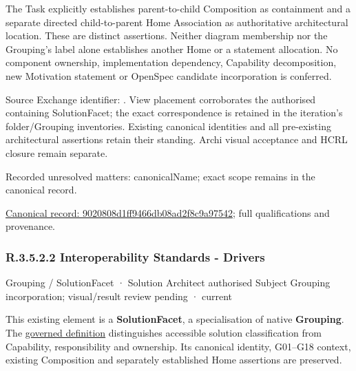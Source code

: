 The Task explicitly establishes parent-to-child Composition as containment and
a separate directed child-to-parent Home Association as authoritative architectural
location. These are distinct assertions. Neither diagram membership nor the
Grouping's label alone establishes another Home or a statement allocation.
No component ownership, implementation dependency, Capability decomposition,
new Motivation statement or OpenSpec candidate incorporation is conferred.



Source Exchange identifier: \texttt{}. View placement corroborates
the authorised containing SolutionFacet; the exact correspondence is retained in the
iteration's folder/Grouping inventories. Existing canonical identities and all
pre-existing architectural assertions retain their standing. Archi visual
acceptance and HCRL closure remain separate.


{\small Recorded unresolved matters: canonicalName; exact scope remains in the canonical record.}\par
{\footnotesize \href{../../../../../../../continuum/grouping/9020808d1ff9466db08ad2f8c9a97542.md}{Canonical record: 9020808d1ff9466db08ad2f8c9a97542}; full qualifications and provenance.}\par
\subsubsection*{R.3.5.2.2 Interoperability Standards - Drivers}
\label{navigation:R.3.5.2.2}

\label{element:bc45121331a04af7a54e790bd4a7ea6e}
{\small Grouping / SolutionFacet · Solution Architect authorised Subject Grouping incorporation; visual/result review pending · current}\par

This existing element is a \textbf{SolutionFacet}, a specialisation of native
\textbf{Grouping}. The \href{\detokenize{../../../../../../../governance/continuum-representation.md#solutionfacet-classification--1119-candidate}}{governed definition}
distinguishes accessible solution classification from Capability, responsibility
and ownership. Its canonical identity, G01–G18 context, existing Composition
and separately established Home assertions are preserved.



